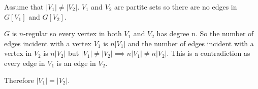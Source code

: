 Assume that $|V_1| \neq |V_2|$. 
$V_1$ and $V_2$ are partite sets so there are no edges in $G[V_1]$ and $G[V_2]$.

$G$ is $n$-regular so every vertex in both $V_1$ and $V_2$ has degree n. So the number of edges incident with a vertex $V_1$ is $n|V_1|$ and the number of edges incident with a vertex in $V_2$ is $n|V_2|$ but $|V_1| \neq |V_2| \implies n|V_1| \neq n|V_2|$. This is a contradiction as every edge in $V_1$ is an edge in $V_2$.  

Therefore $|V_1| = |V_2|$.
